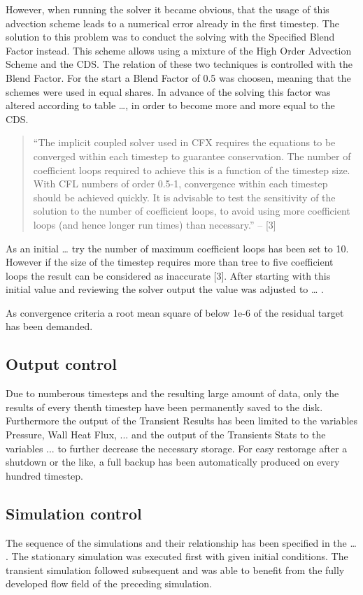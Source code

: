 However, when running the solver it became obvious, that the usage of this advection scheme leads to a numerical error already in the first timestep. The solution to this problem was to conduct the solving with the Specified Blend Factor instead. This scheme allows using a mixture of the High Order Advection Scheme and the CDS. The relation of these two techniques is controlled with the Blend Factor. For the start a Blend Factor of 0.5 was choosen, meaning that the schemes were used in equal shares. In advance of the solving this factor was altered according to table …, in order to become more and more equal to the CDS. 

\begin{quote}
``The implicit coupled solver used in CFX requires the equations to be converged within each timestep to guarantee conservation. The number of coefficient loops required to achieve this is a function of the timestep size. With CFL numbers of order 0.5-1, convergence within each timestep should be achieved quickly. It is advisable to test the sensitivity of the solution to the number of coefficient loops, to avoid using more coefficient loops (and hence longer run times) than necessary.'' – [3]
\end{quote}

As an initial … try the number of maximum coefficient loops has been set to 10. However if the size of the timestep requires more than tree to five coefficient loops the result can be considered as inaccurate [3]. After starting with this initial value and reviewing the solver output the value was adjusted to … .

As convergence criteria a root mean square of below 1e-6 of the residual target has been demanded.
\subsection{Output control}
Due to numberous timesteps and the resulting large amount of data, only the results of every thenth timestep have been permanently saved to the disk. Furthermore the output of the Transient Results has been limited to the variables Pressure, Wall Heat Flux, ... and the output of the Transients Stats to the variables ... to further decrease the necessary storage.
For easy restorage after a shutdown or the like, a full backup has been automatically produced on every hundred timestep.
\subsection{Simulation control}
The sequence of the simulations and their relationship has been specified in the … . The stationary simulation was executed first with given initial conditions. The transient simulation followed subsequent and was able to benefit from the fully developed flow field of the preceding simulation.
